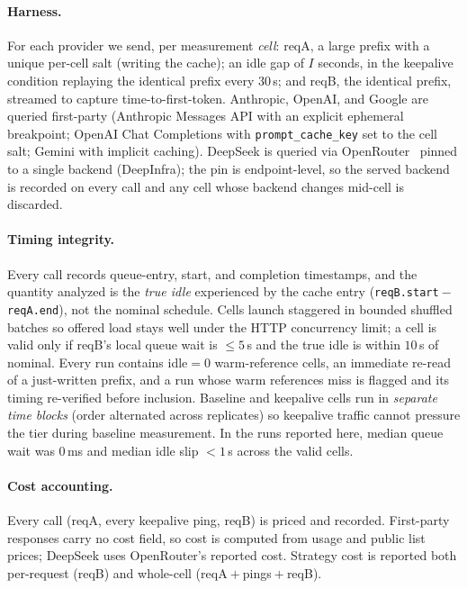 \documentclass[10pt,twocolumn]{article}
\begin{document}
\paragraph{Harness.}
For each provider we send, per measurement \emph{cell}: reqA, a large prefix
with a unique per-cell salt (writing the cache); an idle gap of $I$ seconds, in
the keepalive condition replaying the identical prefix every 30\,s; and reqB,
the identical prefix, streamed to capture time-to-first-token. Anthropic,
OpenAI, and Google are queried first-party (Anthropic Messages API with an
explicit ephemeral breakpoint; OpenAI Chat Completions with
\texttt{prompt\_cache\_key} set to the cell salt; Gemini with implicit
caching). DeepSeek is queried via OpenRouter~\cite{openrouter,openrouter-caching}
pinned to a single backend
(DeepInfra); the pin is endpoint-level, so the served backend is recorded on
every call and any cell whose backend changes mid-cell is discarded.

\paragraph{Timing integrity.}
Every call records queue-entry, start, and completion timestamps, and the
quantity analyzed is the \emph{true idle} experienced by the cache entry
(\texttt{reqB.start}${}-{}$\texttt{reqA.end}), not the nominal schedule. Cells
launch staggered in bounded shuffled batches so offered load stays well under
the HTTP concurrency limit; a cell is valid only if reqB's local queue wait is
${\leq}5$\,s and the true idle is within $10$\,s of nominal. Every run contains
idle${}=0$ warm-reference cells, an immediate re-read of a just-written prefix,
and a run whose warm references miss is flagged and its timing re-verified
before inclusion. Baseline and keepalive cells run in \emph{separate time blocks}
(order alternated across replicates) so keepalive traffic cannot pressure the
tier during baseline measurement. In the runs reported here, median queue wait
was 0\,ms and median idle slip ${<}1$\,s across the valid cells.

\paragraph{Cost accounting.}
Every call (reqA, every keepalive ping, reqB) is priced and recorded.
First-party responses carry no cost field, so cost is computed from usage and
public list prices; DeepSeek uses OpenRouter's reported cost. Strategy cost is
reported both per-request (reqB) and whole-cell (reqA${}+{}$pings${}+{}$reqB).
\end{document}
